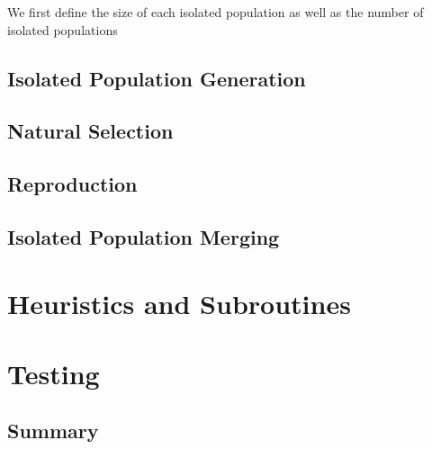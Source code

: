 \documentclass[12pt]{article}
\begin{document}
  We first define the size of each isolated population as well as the number of isolated populations 
  \subsection{Isolated Population Generation}
  \subsection{Natural Selection}
  \subsection{Reproduction}
  \subsection{Isolated Population Merging}

\section{Heuristics and Subroutines}
\section{Testing}

  \subsection{Summary}
\end{document}
